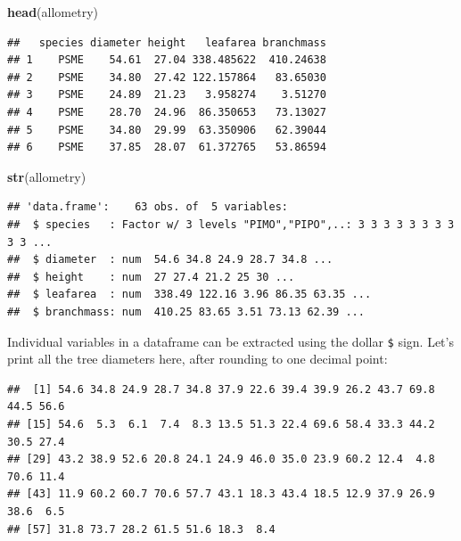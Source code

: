 \documentclass[]{book}
\newenvironment{Shaded}{\begin{snugshade}}{\end{snugshade}}
\newcommand{\DecValTok}[1]{\textcolor[rgb]{0.00,0.00,0.81}{#1}}
\newcommand{\KeywordTok}[1]{\textcolor[rgb]{0.13,0.29,0.53}{\textbf{#1}}}
\newcommand{\NormalTok}[1]{#1}
\newcommand{\OperatorTok}[1]{\textcolor[rgb]{0.81,0.36,0.00}{\textbf{#1}}}
\begin{document}
\begin{Shaded}
\begin{Highlighting}[]
\KeywordTok{head}\NormalTok{(allometry)}
\end{Highlighting}
\end{Shaded}

\begin{verbatim}
##   species diameter height   leafarea branchmass
## 1    PSME    54.61  27.04 338.485622  410.24638
## 2    PSME    34.80  27.42 122.157864   83.65030
## 3    PSME    24.89  21.23   3.958274    3.51270
## 4    PSME    28.70  24.96  86.350653   73.13027
## 5    PSME    34.80  29.99  63.350906   62.39044
## 6    PSME    37.85  28.07  61.372765   53.86594
\end{verbatim}

\begin{Shaded}
\begin{Highlighting}[]
\KeywordTok{str}\NormalTok{(allometry)}
\end{Highlighting}
\end{Shaded}

\begin{verbatim}
## 'data.frame':    63 obs. of  5 variables:
##  $ species   : Factor w/ 3 levels "PIMO","PIPO",..: 3 3 3 3 3 3 3 3 3 3 ...
##  $ diameter  : num  54.6 34.8 24.9 28.7 34.8 ...
##  $ height    : num  27 27.4 21.2 25 30 ...
##  $ leafarea  : num  338.49 122.16 3.96 86.35 63.35 ...
##  $ branchmass: num  410.25 83.65 3.51 73.13 62.39 ...
\end{verbatim}

Individual variables in a dataframe can be extracted using the dollar \texttt{\$} sign.
Let's print all the tree diameters here, after rounding to one decimal point:

\begin{Shaded}
\end{Shaded}

\begin{verbatim}
##  [1] 54.6 34.8 24.9 28.7 34.8 37.9 22.6 39.4 39.9 26.2 43.7 69.8 44.5 56.6
## [15] 54.6  5.3  6.1  7.4  8.3 13.5 51.3 22.4 69.6 58.4 33.3 44.2 30.5 27.4
## [29] 43.2 38.9 52.6 20.8 24.1 24.9 46.0 35.0 23.9 60.2 12.4  4.8 70.6 11.4
## [43] 11.9 60.2 60.7 70.6 57.7 43.1 18.3 43.4 18.5 12.9 37.9 26.9 38.6  6.5
## [57] 31.8 73.7 28.2 61.5 51.6 18.3  8.4
\end{verbatim}
\end{document}

